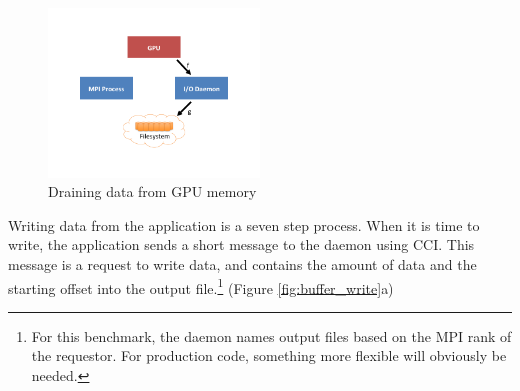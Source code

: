 \begin{figure}
\includegraphics[trim = .75in .75in .75in .75in, clip, width=0.5\textwidth]{figures/Data_Movement/Slide21}%
\caption{Draining data from GPU memory}
\label{fig:buffer_drain}
\end{figure}



Writing data from the application is a seven step process. When it is time to write, the application sends a short message to the daemon using CCI.  This message is a request to write data, and contains the amount of data and the starting offset into the output file.\footnote{For this benchmark, the daemon names output files based on the MPI rank of the requestor.  For production code, something more flexible will obviously be needed.} (Figure \ref{fig:buffer_write}a)

